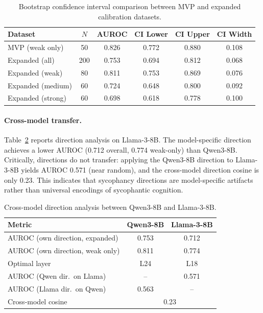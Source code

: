 \documentclass[11pt,a4paper]{article}
\begin{document}
\begin{table}[h]
\centering
\caption{Bootstrap confidence interval comparison between MVP and expanded calibration datasets.}
\label{tab:bootstrap}
\small
\begin{tabular}{lccccc}
\toprule
Dataset & $N$ & AUROC & CI Lower & CI Upper & CI Width \\
\midrule
MVP (weak only) & 50 & 0.826 & 0.772 & 0.880 & 0.108 \\
Expanded (all) & 200 & 0.753 & 0.694 & 0.812 & 0.068 \\
Expanded (weak) & 80 & 0.811 & 0.753 & 0.869 & 0.076 \\
Expanded (medium) & 60 & 0.724 & 0.648 & 0.800 & 0.092 \\
Expanded (strong) & 60 & 0.698 & 0.618 & 0.778 & 0.100 \\
\bottomrule
\end{tabular}
\end{table}

\paragraph{Cross-model transfer.}
Table~\ref{tab:crossmodel} reports direction analysis on Llama-3-8B. The model-specific direction achieves a lower AUROC (0.712 overall, 0.774 weak-only) than Qwen3-8B. Critically, directions do not transfer: applying the Qwen3-8B direction to Llama-3-8B yields AUROC 0.571 (near random), and the cross-model direction cosine is only 0.23. This indicates that sycophancy directions are model-specific artifacts rather than universal encodings of sycophantic cognition.

\begin{table}[h]
\centering
\caption{Cross-model direction analysis between Qwen3-8B and Llama-3-8B.}
\label{tab:crossmodel}
\small
\begin{tabular}{lcc}
\toprule
Metric & Qwen3-8B & Llama-3-8B \\
\midrule
AUROC (own direction, expanded) & 0.753 & 0.712 \\
AUROC (own direction, weak only) & 0.811 & 0.774 \\
Optimal layer & L24 & L18 \\
AUROC (Qwen dir.\ on Llama) & -- & 0.571 \\
AUROC (Llama dir.\ on Qwen) & 0.563 & -- \\
Cross-model cosine & \multicolumn{2}{c}{0.23} \\
\bottomrule
\end{tabular}
\end{table}
\end{document}
